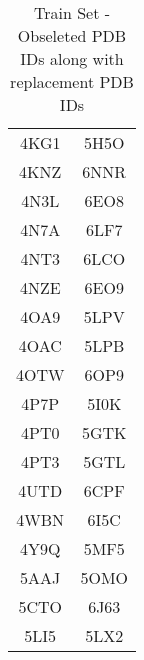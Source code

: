 \documentclass[journal=jacsat,manuscript=article]{achemso}
\begin{document}
\begin{center}
\begin{table}[ht]
\begin{tabular}{|c|c|}
      4KG1                       & 5H5O                         \\
      4KNZ                       & 6NNR                         \\
      4N3L                       & 6EO8                         \\
      4N7A                       & 6LF7                         \\
      4NT3                       & 6LCO                         \\
      4NZE                       & 6EO9                         \\
      4OA9                       & 5LPV                         \\
      4OAC                       & 5LPB                         \\
      4OTW                       & 6OP9                         \\
      4P7P                       & 5I0K                         \\
      4PT0                       & 5GTK                         \\
      4PT3                       & 5GTL                         \\
      4UTD                       & 6CPF                         \\
      4WBN                       & 6I5C                         \\
      4Y9Q                       & 5MF5                         \\
      5AAJ                       & 5OMO                         \\
      5CTO                       & 6J63                         \\
      5LI5                       & 5LX2                         \\
      \hline
    \end{tabular}
    \caption{Train Set - Obseleted PDB IDs along with replacement PDB IDs}
    \label{table:trainobseleted}
  \end{table}
\end{center}
\clearpage
\end{document}

